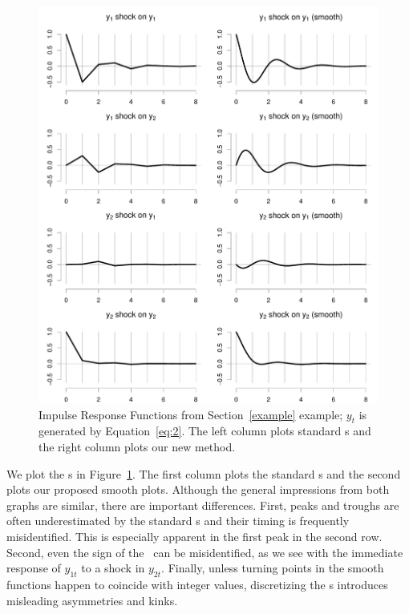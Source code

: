 \documentclass[12pt,fleqn]{article}
\begin{document}
\begin{figure}[t]
  \centering
  \includegraphics{graphs/numeric.pdf}
  \caption{Impulse Response Functions from Section~\ref{example}
    example; $y_t$ is generated by Equation~\eqref{eq:2}. The left
    column plots standard \IRF s and the right column plots our new
    method.}
  \label{f1}
\end{figure}

We plot the \IRF s in Figure~\ref{f1}. The first column plots the
standard \IRF s and the second plots our proposed smooth
plots. Although the general impressions from both graphs are similar,
there are important differences. First, peaks and troughs are often
underestimated by the standard \IRF s and their timing is frequently
misidentified. This is especially apparent in the first peak in the
second row. Second, even the sign of the \IRF\ can be misidentified,
as we see with the immediate response of $y_{1t}$ to a shock in
$y_{2t}$. Finally, unless turning points in the smooth functions
happen to coincide with integer values, discretizing the \IRF s
introduces misleading asymmetries and kinks.
\end{document}
